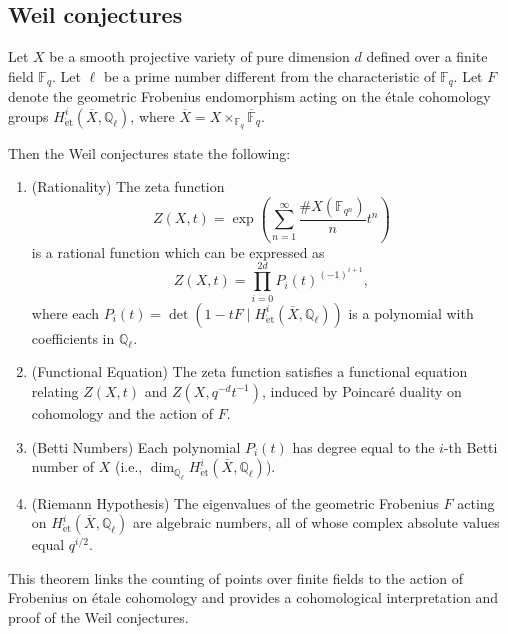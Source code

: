 \subsection{Weil conjectures}

\begin{theorem}
Let $X$ be a smooth projective variety of pure dimension $d$ defined over a finite field $\mathbb{F}_q$. Let $\ell$ be a prime number different from the characteristic of $\mathbb{F}_q$. Let $F$ denote the geometric Frobenius endomorphism acting on the étale cohomology groups $H^i_{\mathrm{\acute{e}t}}(\overline{X}, \mathbb{Q}_\ell)$, where $\overline{X} = X \times_{\mathbb{F}_q} \overline{\mathbb{F}}_q$.

Then the Weil conjectures state the following:

\begin{enumerate}
    \item (Rationality) The zeta function
    $$
    Z(X, t) = \exp\left( \sum_{n=1}^\infty \frac{\# X(\mathbb{F}_{q^n})}{n} t^n \right)
    $$
    is a rational function which can be expressed as
    $$
    Z(X,t) = \prod_{i=0}^{2d} P_i(t)^{(-1)^{i+1}},
    $$
    where each $P_i(t) = \det(1 - t F \mid H^i_{\mathrm{\acute{e}t}}(\overline{X}, \mathbb{Q}_\ell))$ is a polynomial with coefficients in $\mathbb{Q}_\ell$.
    
    \item (Functional Equation) The zeta function satisfies a functional equation relating $Z(X,t)$ and $Z(X, q^{-d} t^{-1})$, induced by Poincaré duality on cohomology and the action of $F$.
    
    \item (Betti Numbers) Each polynomial $P_i(t)$ has degree equal to the $i$-th Betti number of $X$ (i.e., $\dim_{\mathbb{Q}_\ell} H^i_{\mathrm{\acute{e}t}}(\overline{X}, \mathbb{Q}_\ell)$).
    
    \item (Riemann Hypothesis) The eigenvalues of the geometric Frobenius $F$ acting on $H^i_{\mathrm{\acute{e}t}}(\overline{X}, \mathbb{Q}_\ell)$ are algebraic numbers, all of whose complex absolute values equal $q^{i/2}$.
\end{enumerate}

This theorem links the counting of points over finite fields to the action of Frobenius on étale cohomology and provides a cohomological interpretation and proof of the Weil conjectures.
\end{theorem}


